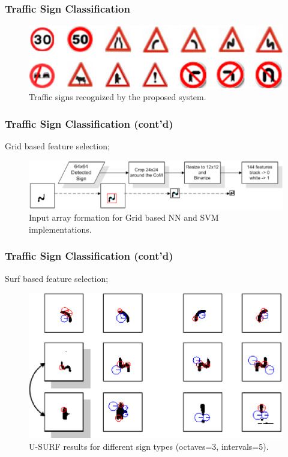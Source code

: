 \documentclass{beamer}
\begin{document}
\frame
{
  \frametitle{Traffic Sign Classification}
	\begin{figure}[ht]
	\begin{center}
	\includegraphics[width=.8\paperwidth]{../img/signs_vertical.eps}
	\caption{Traffic signs recognized by the proposed system.}
	\label{fig:signs}
	\end{center}
	\end{figure}	
}

\frame
{
  \frametitle{Traffic Sign Classification (cont'd)}
  Grid based feature selection;
	\begin{figure}[ht]
	\begin{center}
	\includegraphics[width=.8\paperwidth]{../img/nn12.eps}
	\caption{Input array formation for Grid based NN and SVM implementations.}
	\end{center}
	\end{figure}
}

\frame
{
  \frametitle{Traffic Sign Classification (cont'd)}
  Surf based feature selection;
	\begin{figure}[ht]
	\begin{center}
	\includegraphics[width=.8\paperwidth]{../img/surf.eps}
	\caption{U-SURF results for different sign types (octaves=3, intervals=5).}
	\end{center}
	\end{figure}
}
\end{document}
